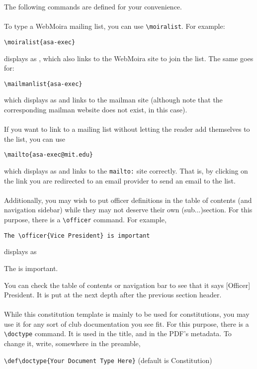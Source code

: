 \documentclass{constitution}
\begin{document}
The following commands are defined for your convenience.
\\\\
To type a WebMoira mailing list, you can use \verb|\moiralist|.
For example:\par
    \quad \verb|\moiralist{asa-exec}|\par
displays as , which also links to the WebMoira site to join the list.
The same goes for: \par
    \quad \verb|\mailmanlist{asa-exec}|\par
which displays as  and links to the mailman site (although note that the corresponding mailman website does not exist, in this case).
\\\\
If you want to link to a mailing list without letting the reader add themselves to the list, you can use\par
\quad \verb|\mailto{asa-exec@mit.edu}|\par
which displays as  and links to the \verb|mailto:| site correctly.
That is, by clicking on the link you are redirected to an email provider to send an email to the list.
\\\\
Additionally, you may wish to put officer definitions in the table of contents (and navigation sidebar) while they may not deserve their own (sub...)section.
For this purpose, there is a \verb|\officer| command.
For example,\par
\quad \verb|The \officer{Vice President} is important|\par
displays as\par
\quad The  is important.\par
You can check the table of contents or navigation bar to see that it says [Officer] President.
It is put at the next depth after the previous section header.
\\\\
While this constitution template is mainly to be used for constitutions, you may use it for any sort of club documentation you see fit.
For this purpose, there is a \verb|\doctype| command.
It is used in the title, and in the PDF's metadata.
To change it, write, somewhere in the preamble,\par
\quad \verb|\def\doctype{Your Document Type Here}| (default is Constitution)

\label{headers}
\end{document}
